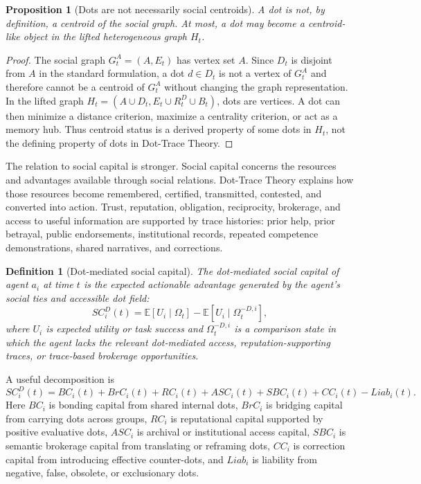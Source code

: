 \documentclass[11pt]{article}
\newtheorem{definition}{Definition}
\newtheorem{proposition}{Proposition}
\theoremstyle{remark}
\begin{document}
\begin{proposition}[Dots are not necessarily social centroids]
A dot is not, by definition, a centroid of the social graph. At most, a dot may become a centroid-like object in the lifted heterogeneous graph $H_t$.
\end{proposition}

\begin{proof}
The social graph $G^A_t=(A,E_t)$ has vertex set $A$. Since $D_t$ is disjoint from $A$ in the standard formulation, a dot $d\in D_t$ is not a vertex of $G^A_t$ and therefore cannot be a centroid of $G^A_t$ without changing the graph representation. In the lifted graph $H_t=(A\cup D_t,E_t\cup R_t^D\cup B_t)$, dots are vertices. A dot can then minimize a distance criterion, maximize a centrality criterion, or act as a memory hub. Thus centroid status is a derived property of some dots in $H_t$, not the defining property of dots in Dot-Trace Theory.
\end{proof}

The relation to social capital is stronger. Social capital concerns the resources and advantages available through social relations. Dot-Trace Theory explains how those resources become remembered, certified, transmitted, contested, and converted into action. Trust, reputation, obligation, reciprocity, brokerage, and access to useful information are supported by trace histories: prior help, prior betrayal, public endorsements, institutional records, repeated competence demonstrations, shared narratives, and corrections.

\begin{definition}[Dot-mediated social capital]
The dot-mediated social capital of agent $a_i$ at time $t$ is the expected actionable advantage generated by the agent's social ties and accessible dot field:
\[
SC_i^D(t)=\mathbb{E}[U_i\mid \Omega_t]-\mathbb{E}[U_i\mid \Omega_t^{-D,i}],
\]
where $U_i$ is expected utility or task success and $\Omega_t^{-D,i}$ is a comparison state in which the agent lacks the relevant dot-mediated access, reputation-supporting traces, or trace-based brokerage opportunities.
\end{definition}

A useful decomposition is
\[
SC_i^D(t)=BC_i(t)+BrC_i(t)+RC_i(t)+ASC_i(t)+SBC_i(t)+CC_i(t)-Liab_i(t).
\]
Here $BC_i$ is bonding capital from shared internal dots, $BrC_i$ is bridging capital from carrying dots across groups, $RC_i$ is reputational capital supported by positive evaluative dots, $ASC_i$ is archival or institutional access capital, $SBC_i$ is semantic brokerage capital from translating or reframing dots, $CC_i$ is correction capital from introducing effective counter-dots, and $Liab_i$ is liability from negative, false, obsolete, or exclusionary dots.
\end{document}
